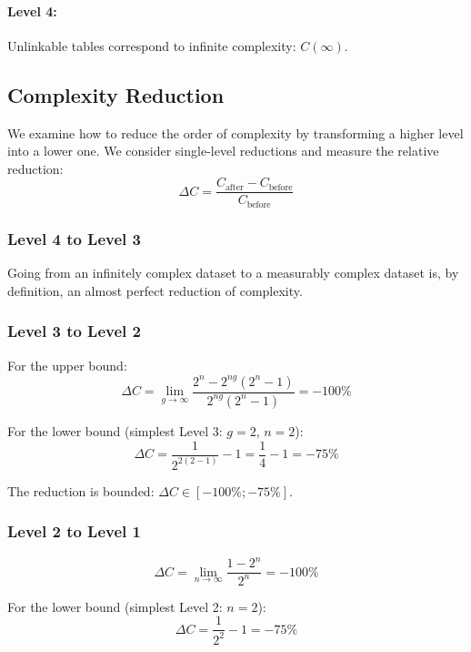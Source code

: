 \documentclass[12pt,a4paper]{article}
\begin{document}
\paragraph{Level 4:}
Unlinkable tables correspond to infinite complexity: $C(\infty)$.

\subsection{Complexity Reduction}

We examine how to reduce the order of complexity by transforming a higher level into a lower one. We consider single-level reductions and measure the relative reduction:
\begin{equation}
\Delta C = \frac{C_{\text{after}} - C_{\text{before}}}{C_{\text{before}}}
\end{equation}

\subsubsection{Level 4 to Level 3}
Going from an infinitely complex dataset to a measurably complex dataset is, by definition, an almost perfect reduction of complexity.

\subsubsection{Level 3 to Level 2}
For the upper bound:
\begin{equation}
\Delta C = \lim_{g \to \infty} \frac{2^n - 2^{ng}(2^n - 1)}{2^{ng}(2^n - 1)} = -100\%
\end{equation}

For the lower bound (simplest Level 3: $g=2$, $n=2$):
\begin{equation}
\Delta C = \frac{1}{2^{2(2-1)}} - 1 = \frac{1}{4} - 1 = -75\%
\end{equation}

The reduction is bounded: $\Delta C \in [-100\%; -75\%]$.

\subsubsection{Level 2 to Level 1}
\begin{equation}
\Delta C = \lim_{n \to \infty} \frac{1 - 2^n}{2^n} = -100\%
\end{equation}

For the lower bound (simplest Level 2: $n=2$):
\begin{equation}
\Delta C = \frac{1}{2^2} - 1 = -75\%
\end{equation}
\end{document}

